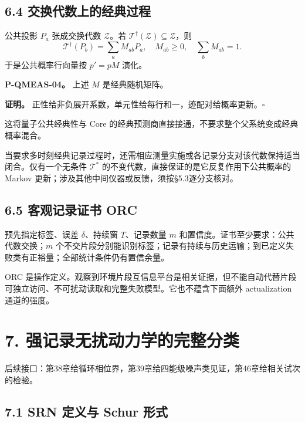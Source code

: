 \documentclass[
  11pt,
  oneside]{book}
\begin{document}
\hypertarget{ux4ea4ux6362ux4ee3ux6570ux4e0aux7684ux7ecfux5178ux8fc7ux7a0b}{%
\section{6.4
交换代数上的经典过程}\label{ux4ea4ux6362ux4ee3ux6570ux4e0aux7684ux7ecfux5178ux8fc7ux7a0b}}

公共投影 \(P_a\) 张成交换代数 \(\mathcal Z\)。若
\(\mathcal T^\dagger(\mathcal Z)\subseteq\mathcal Z\)，则 \[
\mathcal T^\dagger(P_b)=\sum_a M_{ab}P_a,\quad
M_{ab}\ge0,\quad\sum_bM_{ab}=1.
\] 于是公共概率行向量按 \(p'=pM\) 演化。

\protect\hypertarget{p-qmeas-04}{}{}

\textbf{P-QMEAS-04。} 上述 \(M\) 是经典随机矩阵。

\textbf{证明。}
正性给非负展开系数，单元性给每行和一，迹配对给概率更新。\(\square\)

这将量子公共经典性与 Core
的经典预测商直接接通，不要求整个父系统变成经典概率混合。

当要求多时刻经典记录过程时，还需相应测量实施或各记录分支对该代数保持适当闭合。仅有一个无条件
\(\mathcal T^*\) 的不变代数，直接保证的是它反复作用下公共概率的 Markov
更新；涉及其他中间仪器或反馈，须按§5.3逐分支核对。

\hypertarget{ux5ba2ux89c2ux8bb0ux5f55ux8bc1ux4e66-orc}{%
\section{6.5 客观记录证书
ORC}\label{ux5ba2ux89c2ux8bb0ux5f55ux8bc1ux4e66-orc}}

预先指定标签、误差 \(\delta\)、持续窗 \(T\)、记录数量 \(m\)
和置信度。证书至少要求：公共代数交换；\(m\)
个不交片段分别能识别标签；记录有持续与历史运输；到已定义失败类有正裕量；全部统计条件仍有置信余量。

ORC
是操作定义。观察到环境片段互信息平台是相关证据，但不能自动代替片段可独立访问、不可扰动读取和完整失败模型。它也不蕴含下面额外
actualization 通道的强度。

\hypertarget{ch-7}{%
\chapter{7. 强记录无扰动力学的完整分类}\label{ch-7}}

后续接口：第38章给循环相位界，第39章给四能级噪声类见证，第46章给相关试次的检验。

\hypertarget{srn-ux5b9aux4e49ux4e0e-schur-ux5f62ux5f0f}{%
\section{7.1 SRN 定义与 Schur
形式}\label{srn-ux5b9aux4e49ux4e0e-schur-ux5f62ux5f0f}}
\end{document}

